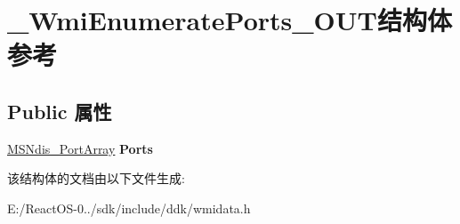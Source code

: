 \hypertarget{struct___wmi_enumerate_ports___o_u_t}{}\section{\+\_\+\+Wmi\+Enumerate\+Ports\+\_\+\+O\+U\+T结构体 参考}
\label{struct___wmi_enumerate_ports___o_u_t}
\subsection*{Public 属性}
\begin{DoxyCompactItemize}
\item 
\mbox{\label{struct___wmi_enumerate_ports___o_u_t_ae5805575ab0853033fa568c5a92b9799}} 
\hyperlink{struct___m_s_ndis___port_array}{M\+S\+Ndis\+\_\+\+Port\+Array} {\bfseries Ports}
\end{DoxyCompactItemize}


该结构体的文档由以下文件生成\+:\begin{DoxyCompactItemize}
\item 
E\+:/\+React\+O\+S-\/0../sdk/include/ddk/wmidata.\+h\end{DoxyCompactItemize}
